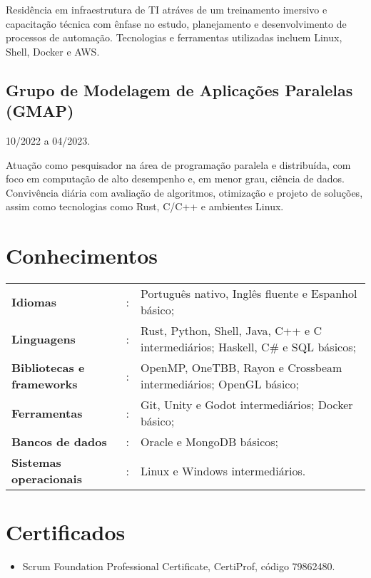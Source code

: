 \documentclass[11pt]{article}
\begin{document}
Residência em infraestrutura de TI atráves de um treinamento imersivo e
capacitação técnica com ênfase no estudo, planejamento e desenvolvimento de
processos de automação. Tecnologias e ferramentas utilizadas incluem Linux,
Shell, Docker e AWS.

\subsection*{Grupo de Modelagem de Aplicações Paralelas (GMAP) \hfill {}}

10/2022 a 04/2023.

Atuação como pesquisador na área de programação paralela e distribuída, com
foco em computação de alto desempenho e, em menor grau, ciência de dados.
Convivência diária com avaliação de algoritmos, otimização e projeto de
soluções, assim como tecnologias como Rust, C/C++ e ambientes Linux.

\section*{Conhecimentos}

\begin{tabular}{ l@{} c l }
	\textbf{Idiomas} &:&Português nativo, Inglês fluente e Espanhol básico;\\
	\textbf{Linguagens} &:&Rust, Python, Shell, Java, C++ e C intermediários; Haskell, C\# e SQL básicos;\\
	\textbf{Bibliotecas e frameworks} &:&OpenMP, OneTBB, Rayon e Crossbeam intermediários; OpenGL básico;\\
	\textbf{Ferramentas} &:&Git, Unity e Godot intermediários; Docker básico;\\
	\textbf{Bancos de dados} &:&Oracle e MongoDB básicos;\\
	\textbf{Sistemas operacionais} &:&Linux e Windows intermediários.\\
\end{tabular}

\section*{Certificados}

\begin{itemize}
	\item Scrum Foundation Professional Certificate, CertiProf, código 79862480.
\end{itemize}
\end{document}
